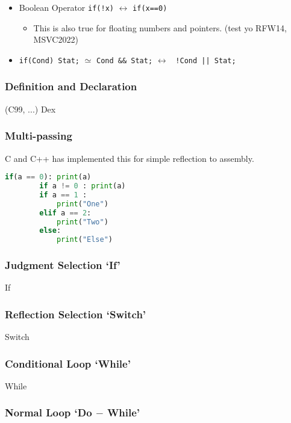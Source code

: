 \begin{itemize}
	\item{Boolean Operator \verb|if(!x)| $\leftrightarrow$ \verb|if(x==0)|
		\begin{itemize}\item This is also true for floating numbers and pointers. (test yo RFW14, MSVC2022) \end{itemize}
	}
	
	\item{\verb|if(Cond) Stat;| $\simeq$ \verb|Cond && Stat;| $\leftrightarrow$ \verb# !Cond || Stat; #
	}
\end{itemize}

\subsubsection{Definition and Declaration} (C99, ...)
{Dex}

\subsubsection{Multi-passing}

	C and C++ has implemented this for simple reflection to assembly.


	\begin{lstlisting}[language=Python]
		if(a == 0): print(a)
		if a != 0 : print(a)
		if a == 1 :
			print("One")
		elif a == 2:
			print("Two")
		else:
			print("Else")
	\end{lstlisting}


\subsubsection{Judgment Selection `If'}
{If}

\subsubsection{Reflection Selection `Switch'}
{Switch}

\subsubsection{Conditional Loop `While'}
{While}
	
\subsubsection{Normal Loop `Do $-$ While'}

